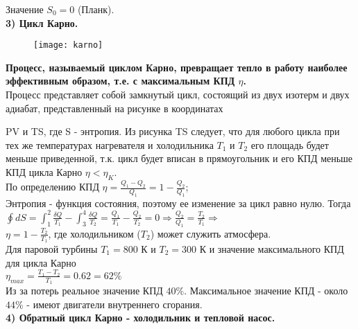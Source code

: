 \documentclass[12pt]{article}
\begin{document}
{{Значение {\bf $S_0=0$} (Планк).\\

{\bf 3) Цикл Карно.}\\

\begin{figure}[h]
\begin{center}
\texttt{[image: karno]}
\end{center}
\end{figure}



{\bf Процесс, называемый циклом Карно, превращает тепло в работу наиболее эффективным образом, т.е. с максимальным КПД $\eta$.}\\

Процесс представляет собой замкнутый цикл, состоящий из двух изотерм и двух адиабат, представленный на рисунке
в координатах

PV и TS, где S - энтропия. Из рисунка TS следует, что для любого цикла при тех же температурах нагревателя и холодильника $T_1$ и $T_2$ его площадь будет меньше приведенной, т.к. цикл будет вписан в прямоугольник и его КПД меньше КПД цикла Карно $\eta<\eta_K$.\\

По определению КПД $\eta=\frac{Q_1-Q_2}{Q_1}=1-\frac{Q_2}{Q_1}$;\\

Энтропия - функция состояния, поэтому ее изменение за цикл равно нулю. Тогда\\

$\oint dS=\int_1^2\frac{\delta Q}{T_1}-\int_3^4\frac{\delta Q}{T_2}=\frac{Q_1}{T_1}-\frac{Q_2}{T_2}=0 \Rightarrow \frac{Q_2}{Q_1}=\frac{T_2}{T_1} \Rightarrow $\\

$\eta=1-\frac{T_2}{T_1}$, где холодильником ($T_2$) может служить атмосфера.\\

Для паровой турбины $T_1=800$ К и $T_2=300$ К и значение максимального КПД для цикла Карно\\

$\eta_{max}=\frac{T_1-T_2}{T_1}=0.62=62\%$\\

Из за потерь реальное значение КПД $40\%$. Максимальное значение КПД - около $44\%$ - имеют двигатели внутреннего сгорания.\\


{\bf 4) Обратный цикл Карно - холодильник и тепловой насос.}


}}
\end{document}
